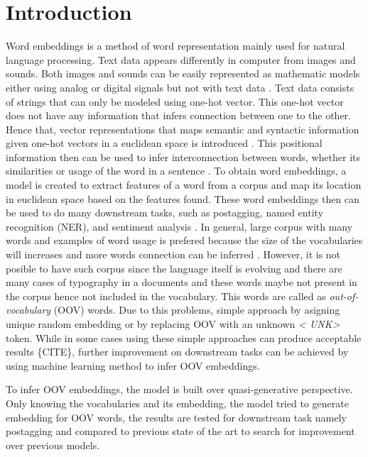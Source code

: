 \chapter{Introduction}
\label{chap:intro}

Word embeddings is a method of word representation mainly used for
natural language processing. Text data appears differently in computer
from images and sounds. Both images and sounds can be easily
represented as mathematic models either using analog or digital
signals but not with text data \citep{wordembedding2017yang}. Text
data consists of strings that can only be modeled using one-hot
vector. This one-hot vector does not have any information that infers
connection between one to the other. Hence that, vector
representations that maps semantic and syntactic information given
one-hot vectors in a euclidean space is introduced
\citep{wordembedding2017yang}. This positional information then can be
used to infer interconnection between words, whether its similarities
or usage of the word in a sentence \citep{distributional1954harris}.
To obtain word embeddings, a model is created to extract features of a
word from a corpus and map its location in euclidean space based on
the features found. These word embeddings then can be used to do many
downstream tasks, such as postagging, named entity recognition (NER),
and sentiment analysis \citep{finding2015ling, neural2016lample}. In
general, large corpus with many words and examples of word usage is
prefered because the size of the vocabularies will increases and more
words connection can be inferred \citep{size2018kutuzov}. However, it
is not posible to have such corpus since the language itself is
evolving and there are many cases of typography in a documents and
these words maybe not present in the corpus hence not included in the
vocabulary. This words are called as \textit{out-of-vocabulary} (OOV)
words. Due to this problems, simple approach by asigning unique random
embedding or by replacing OOV with an unknown \textit{\textless
UNK\textgreater} token. While in some cases using these simple
approaches can produce acceptable results \{CITE\}, further
improvement on downstream tasks can be achieved by using machine
learning method to infer OOV embeddings. 

To infer OOV embeddings, the model is built over quasi-generative
perspective. Only knowing the vocabularies and its embedding, the
model tried to generate embedding for OOV words, the results are
tested for downstream task namely postagging and compared to previous
state of the art to search for improvement over previous models.

